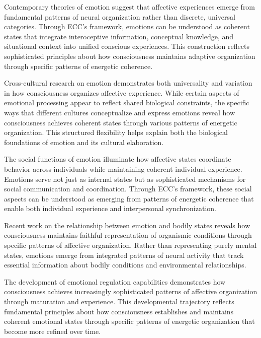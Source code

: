 \begin{refsection}
Contemporary theories of emotion \cite{Barrett2017} suggest that affective experiences emerge from fundamental patterns of neural organization rather than discrete, universal categories. Through ECC's framework, emotions can be understood as coherent states that integrate interoceptive information, conceptual knowledge, and situational context into unified conscious experiences. This construction reflects sophisticated principles about how consciousness maintains adaptive organization through specific patterns of energetic coherence.

Cross-cultural research on emotion \cite{Lutz1988} demonstrates both universality and variation in how consciousness organizes affective experience. While certain aspects of emotional processing appear to reflect shared biological constraints, the specific ways that different cultures conceptualize and express emotions reveal how consciousness achieves coherent states through various patterns of energetic organization. This structured flexibility helps explain both the biological foundations of emotion and its cultural elaboration.

The social functions of emotion \cite{Keltner2001} illuminate how affective states coordinate behavior across individuals while maintaining coherent individual experience. Emotions serve not just as internal states but as sophisticated mechanisms for social communication and coordination. Through ECC's framework, these social aspects can be understood as emerging from patterns of energetic coherence that enable both individual experience and interpersonal synchronization.

Recent work on the relationship between emotion and bodily states \cite{Damasio2018} reveals how consciousness maintains faithful representation of organismic conditions through specific patterns of affective organization. Rather than representing purely mental states, emotions emerge from integrated patterns of neural activity that track essential information about bodily conditions and environmental relationships.

The development of emotional regulation capabilities \cite{Siegel2012} demonstrates how consciousness achieves increasingly sophisticated patterns of affective organization through maturation and experience. This developmental trajectory reflects fundamental principles about how consciousness establishes and maintains coherent emotional states through specific patterns of energetic organization that become more refined over time.


\end{refsection}
